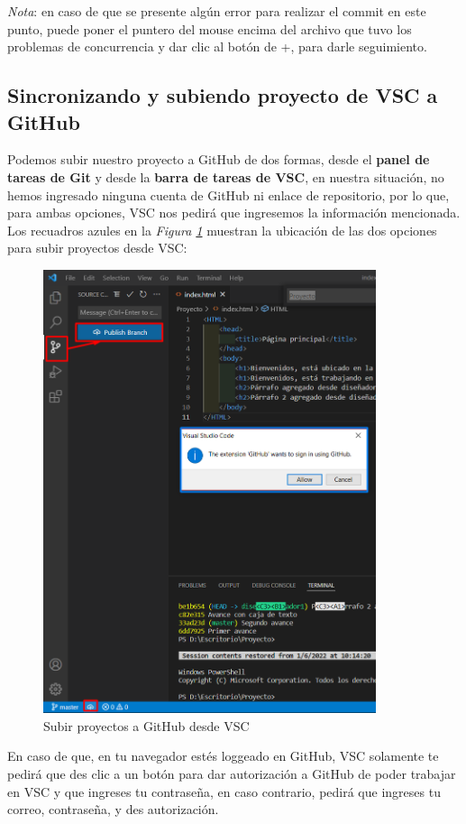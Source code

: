 \textit{Nota}: en caso de que se presente algún error para realizar el commit en este punto, puede poner el puntero del mouse encima del archivo que tuvo los problemas de concurrencia y dar clic al botón de +, para darle seguimiento.


\subsection{Sincronizando y subiendo proyecto de VSC a GitHub}

Podemos subir nuestro proyecto a GitHub de dos formas, desde el \textbf{panel de tareas de Git} y desde la \textbf{barra de tareas de VSC}, en nuestra situación, no hemos ingresado ninguna cuenta de GitHub ni enlace de repositorio, por lo que, para ambas opciones, VSC nos pedirá que ingresemos la información mencionada. Los recuadros azules en la \textit{Figura \ref{fig: 27}} muestran la ubicación de las dos opciones para subir proyectos desde VSC:
\begin{figure}[H]
    \centering
    \caption{Subir proyectos a GitHub desde VSC}
    \label{fig: 27}
    \includegraphics[height=13cm]{capturas/subir_proyecto1.png}
\end{figure}

En caso de que, en tu navegador estés loggeado en GitHub, VSC solamente te pedirá que des clic a un botón para dar autorización a GitHub de poder trabajar en VSC y que ingreses tu contraseña, en caso contrario, pedirá que ingreses tu correo, contraseña, y des autorización.

